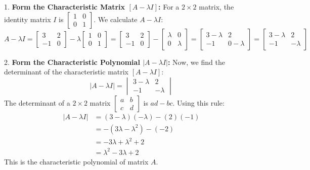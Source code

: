 \documentclass{article}
\begin{document}
1.  \textbf{Form the Characteristic Matrix $[A - \lambda I]$:}
    For a $2 \times 2$ matrix, the identity matrix $I$ is $\begin{bmatrix} 1 & 0 \\ 0 & 1 \end{bmatrix}$.
    We calculate $A - \lambda I$:
    \[ A - \lambda I = \begin{bmatrix} 3 & 2 \\ -1 & 0 \end{bmatrix} - \lambda \begin{bmatrix} 1 & 0 \\ 0 & 1 \end{bmatrix} = \begin{bmatrix} 3 & 2 \\ -1 & 0 \end{bmatrix} - \begin{bmatrix} \lambda & 0 \\ 0 & \lambda \end{bmatrix} = \begin{bmatrix} 3 - \lambda & 2 \\ -1 & 0 - \lambda \end{bmatrix} = \begin{bmatrix} 3 - \lambda & 2 \\ -1 & -\lambda \end{bmatrix} \]

2.  \textbf{Form the Characteristic Polynomial $|A - \lambda I|$:}
    Now, we find the determinant of the characteristic matrix $[A - \lambda I]$:
    \[ |A - \lambda I| = \begin{vmatrix} 3 - \lambda & 2 \\ -1 & -\lambda \end{vmatrix} \]
    The determinant of a $2 \times 2$ matrix $\begin{bmatrix} a & b \\ c & d \end{bmatrix}$ is $ad - bc$. Using this rule:
    \begin{align*} |A - \lambda I| &= (3 - \lambda)(-\lambda) - (2)(-1) \\ &= -(3\lambda - \lambda^2) - (-2) \\ &= -3\lambda + \lambda^2 + 2 \\ &= \lambda^2 - 3\lambda + 2 \end{align*}
    This is the characteristic polynomial of matrix $A$.
\end{document}
